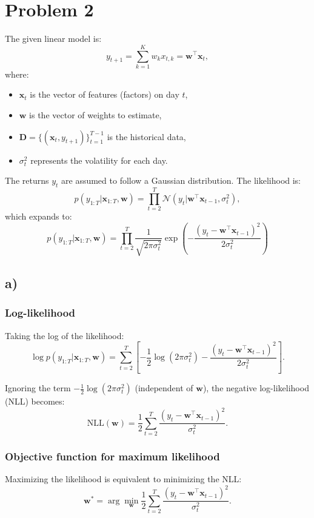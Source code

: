 \documentclass{article}
\begin{document}
\section*{Problem 2}

The given linear model is:
\[
y_{t+1} = \sum_{k=1}^{K} w_k x_{t,k} = \mathbf{w}^\top \mathbf{x}_t,
\]
where:
\begin{itemize}
    \item $\mathbf{x}_t$ is the vector of features (factors) on day $t$,
    \item $\mathbf{w}$ is the vector of weights to estimate,
    \item $\mathbf{D} = \{(\mathbf{x}_t, y_{t+1})\}_{t=1}^{T-1}$ is the historical data,
    \item $\sigma_t^2$ represents the volatility for each day.
\end{itemize}

The returns $y_t$ are assumed to follow a Gaussian distribution. The likelihood is:
\[
p(y_{1:T} | \mathbf{x}_{1:T}, \mathbf{w}) = \prod_{t=2}^T \mathcal{N}\left(y_t | \mathbf{w}^\top \mathbf{x}_{t-1}, \sigma_t^2\right),
\]
which expands to:
\[
p(y_{1:T} | \mathbf{x}_{1:T}, \mathbf{w}) = \prod_{t=2}^T \frac{1}{\sqrt{2\pi \sigma_t^2}} \exp\left(-\frac{(y_t - \mathbf{w}^\top \mathbf{x}_{t-1})^2}{2 \sigma_t^2}\right)
\]

\subsection*{a)}
\subsubsection*{Log-likelihood}
Taking the log of the likelihood:
\[
\log p(y_{1:T} | \mathbf{x}_{1:T}, \mathbf{w}) = \sum_{t=2}^T \left[ -\frac{1}{2} \log(2\pi \sigma_t^2) - \frac{(y_t - \mathbf{w}^\top \mathbf{x}_{t-1})^2}{2 \sigma_t^2} \right].
\]

Ignoring the term $-\frac{1}{2} \log(2\pi \sigma_t^2)$ (independent of $\mathbf{w}$), the negative log-likelihood (NLL) becomes:
\[
\text{NLL}(\mathbf{w}) = \frac{1}{2} \sum_{t=2}^T \frac{(y_t - \mathbf{w}^\top \mathbf{x}_{t-1})^2}{\sigma_t^2}.
\]

\subsubsection*{Objective function for maximum likelihood}
Maximizing the likelihood is equivalent to minimizing the NLL:
\[
\mathbf{w}^* = \arg \min_{\mathbf{w}} \frac{1}{2} \sum_{t=2}^T \frac{(y_t - \mathbf{w}^\top \mathbf{x}_{t-1})^2}{\sigma_t^2}.
\]
\end{document}
